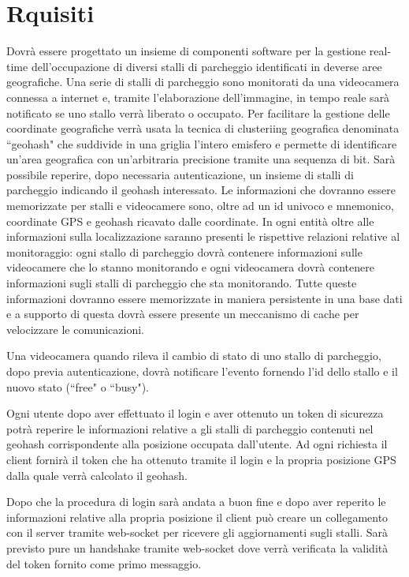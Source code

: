 \chapter{Rquisiti}
Dovrà essere progettato un insieme di componenti software per la gestione real-time dell'occupazione di diversi stalli di parcheggio identificati in deverse aree geografiche.
Una serie di stalli di parcheggio sono monitorati da una videocamera connessa a internet e, tramite l'elaborazione dell'immagine, in tempo reale sarà notificato se uno stallo verrà liberato o occupato. Per facilitare la gestione  delle coordinate geografiche verrà usata la tecnica di clusteriing geografica denominata ``geohash" che suddivide in una griglia l'intero emisfero e permette di identificare un'area geografica con un'arbitraria precisione tramite una sequenza di bit. Sarà possibile reperire, dopo necessaria autenticazione, un insieme di stalli di parcheggio indicando il geohash interessato. Le informazioni che dovranno essere memorizzate per stalli e videocamere sono, oltre ad un id univoco e mnemonico, coordinate GPS e geohash ricavato dalle coordinate. In ogni entità oltre alle informazioni sulla localizzazione saranno presenti le rispettive relazioni relative al monitoraggio: ogni stallo di parcheggio dovrà contenere informazioni sulle videocamere che lo stanno monitorando e ogni videocamera dovrà contenere informazioni sugli stalli di parcheggio che sta monitorando.
Tutte queste informazioni dovranno essere memorizzate in maniera persistente in una base dati e a supporto di questa dovrà essere presente un meccanismo di cache per velocizzare le comunicazioni.

Una videocamera quando rileva il cambio di stato di uno stallo di parcheggio, dopo previa autenticazione, dovrà notificare l'evento fornendo l'id dello stallo e il nuovo stato (``free" o ``busy").

Ogni utente dopo aver effettuato il login e aver ottenuto un token di sicurezza potrà reperire le informazioni relative a gli stalli di parcheggio contenuti nel geohash corrispondente alla posizione occupata dall'utente. Ad ogni richiesta il client fornirà il token che ha ottenuto tramite il login e la propria posizione GPS dalla quale verrà calcolato il geohash.

Dopo che la procedura di login sarà andata a buon fine e dopo aver reperito le informazioni relative alla propria posizione il client può creare un collegamento con il server tramite web-socket per ricevere gli aggiornamenti sugli stalli. Sarà previsto pure un handshake tramite web-socket dove verrà verificata la validità del token fornito come primo messaggio.





